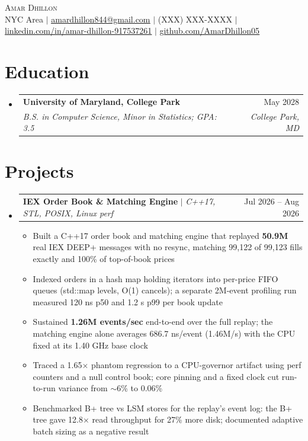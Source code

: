 \documentclass[letterpaper,10pt]{article}
\makeatletter
\newcommand{\resumeItem}[1]{\item{#1}\vspace{-1pt}}
\newcommand{\resumeSubheading}[4]{%
  \vspace{-1pt}\item
  \begin{tabular*}{\textwidth}[t]{l@{\extracolsep{\fill}}r}
    \textbf{#1} & #2 \\
    \textit{#3} & \textit{#4} \\
  \end{tabular*}\vspace{-6pt}%
}
\newcommand{\resumeProjectHeading}[2]{%
  \item
  \begin{tabular*}{\textwidth}{l@{\extracolsep{\fill}}r}
    #1 & #2 \\
  \end{tabular*}\vspace{-6pt}%
}
\newcommand{\resumeSubHeadingListStart}{\begin{itemize}[leftmargin=0in, label={}, itemsep=0pt, topsep=2pt]}
\newcommand{\resumeSubHeadingListEnd}{\end{itemize}}
\newcommand{\resumeItemListStart}{\begin{itemize}[leftmargin=0.18in, itemsep=0pt, topsep=1pt, parsep=0pt]}
\newcommand{\resumeItemListEnd}{\end{itemize}\vspace{0pt}}
\makeatother
\begin{document}
\begin{center}
  {\Huge\scshape\textcolor{accent}{Amar Dhillon}} \\ \vspace{3pt}
  \footnotesize
  NYC Area $|$
  \href{mailto:amardhillon844@gmail.com}{\underline{amardhillon844@gmail.com}} $|$
  (XXX) XXX-XXXX $|$
  \href{https://linkedin.com/in/amar-dhillon-917537261}{\underline{linkedin.com/in/amar-dhillon-917537261}} $|$
  \href{https://github.com/AmarDhillon05}{\underline{github.com/AmarDhillon05}}
\end{center}
\vspace{-6pt}

\section{Education}
\resumeSubHeadingListStart
  \resumeSubheading
    {University of Maryland, College Park}{May 2028}
    {B.S. in Computer Science, Minor in Statistics; GPA: 3.5}{College Park, MD}
\resumeSubHeadingListEnd

\section{Projects}
\resumeSubHeadingListStart
  \resumeProjectHeading
    {\textbf{IEX Order Book \& Matching Engine} $|$ \textit{C++17, STL, POSIX, Linux perf}}{Jul 2026 -- Aug 2026}
  \resumeItemListStart
    \resumeItem{Built a C++17 order book and matching engine that replayed \textbf{50.9M} real IEX DEEP+ messages with no resync, matching 99,122 of 99,123 fills exactly and 100\% of top-of-book prices}
    \resumeItem{Indexed orders in a hash map holding iterators into per-price FIFO queues (std::map levels, O(1) cancels); a separate 2M-event profiling run measured 120 ns p50 and 1.2 \textmu{}s p99 per book update}
    \resumeItem{Sustained \textbf{1.26M events/sec} end-to-end over the full replay; the matching engine alone averages 686.7 ns/event (1.46M/s) with the CPU fixed at its 1.40 GHz base clock}
    \resumeItem{Traced a 1.65$\times$ phantom regression to a CPU-governor artifact using perf counters and a null control book; core pinning and a fixed clock cut run-to-run variance from $\sim$6\% to 0.06\%}
    \resumeItem{Benchmarked B+ tree vs LSM stores for the replay's event log: the B+ tree gave 12.8$\times$ read throughput for 27\% more disk; documented adaptive batch sizing as a negative result}
  \resumeItemListEnd
\resumeSubHeadingListEnd
\end{document}
